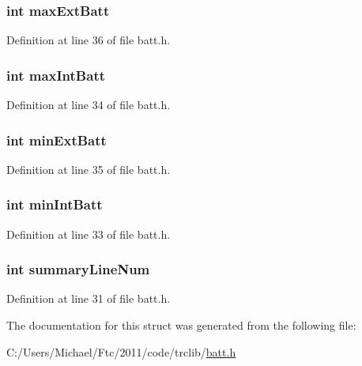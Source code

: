 \hypertarget{struct_b_a_t_t_ab3e254f1929650c5273b15e435770864}{
\subsubsection[{maxExtBatt}]{\setlength{\rightskip}{0pt plus 5cm}int {\bf maxExtBatt}}}
\label{struct_b_a_t_t_ab3e254f1929650c5273b15e435770864}


Definition at line 36 of file batt.h.

\hypertarget{struct_b_a_t_t_a7adb3476743e667b0e908d706265eb3d}{
\subsubsection[{maxIntBatt}]{\setlength{\rightskip}{0pt plus 5cm}int {\bf maxIntBatt}}}
\label{struct_b_a_t_t_a7adb3476743e667b0e908d706265eb3d}


Definition at line 34 of file batt.h.

\hypertarget{struct_b_a_t_t_a30922e3d48aa62accc6a21485c700ee2}{
\subsubsection[{minExtBatt}]{\setlength{\rightskip}{0pt plus 5cm}int {\bf minExtBatt}}}
\label{struct_b_a_t_t_a30922e3d48aa62accc6a21485c700ee2}


Definition at line 35 of file batt.h.

\hypertarget{struct_b_a_t_t_ac2bed0b9f4b76f7d4c426e0641d2ac10}{
\subsubsection[{minIntBatt}]{\setlength{\rightskip}{0pt plus 5cm}int {\bf minIntBatt}}}
\label{struct_b_a_t_t_ac2bed0b9f4b76f7d4c426e0641d2ac10}


Definition at line 33 of file batt.h.

\hypertarget{struct_b_a_t_t_ac7964f3d8bf35ee816b91dd5fb04f3ab}{
\subsubsection[{summaryLineNum}]{\setlength{\rightskip}{0pt plus 5cm}int {\bf summaryLineNum}}}
\label{struct_b_a_t_t_ac7964f3d8bf35ee816b91dd5fb04f3ab}


Definition at line 31 of file batt.h.



The documentation for this struct was generated from the following file:\begin{DoxyCompactItemize}
\item 
C:/Users/Michael/Ftc/2011/code/trclib/\hyperlink{batt_8h}{batt.h}\end{DoxyCompactItemize}
